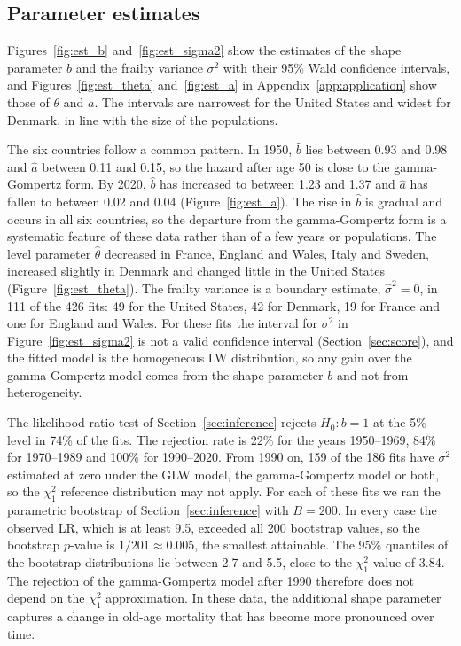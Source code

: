 \documentclass[12pt]{article}
\begin{document}
\subsection{Parameter estimates}

Figures~\ref{fig:est_b} and~\ref{fig:est_sigma2} show the estimates of the shape parameter $b$ and the frailty variance $\sigma^2$ with their 95\% Wald confidence intervals, and Figures~\ref{fig:est_theta} and~\ref{fig:est_a} in Appendix~\ref{app:application} show those of $\theta$ and $a$. The intervals are narrowest for the United States and widest for Denmark, in line with the size of the populations.

The six countries follow a common pattern. In 1950, $\hat b$ lies between 0.93 and 0.98 and $\hat a$ between 0.11 and 0.15, so the hazard after age 50 is close to the gamma-Gompertz form. By 2020, $\hat b$ has increased to between 1.23 and 1.37 and $\hat a$ has fallen to between 0.02 and 0.04 (Figure~\ref{fig:est_a}). The rise in $\hat b$ is gradual and occurs in all six countries, so the departure from the gamma-Gompertz form is a systematic feature of these data rather than of a few years or populations. The level parameter $\hat\theta$ decreased in France, England and Wales, Italy and Sweden, increased slightly in Denmark and changed little in the United States (Figure~\ref{fig:est_theta}). The frailty variance is a boundary estimate, $\hat\sigma^2=0$, in 111 of the 426 fits: 49 for the United States, 42 for Denmark, 19 for France and one for England and Wales. For these fits the interval for $\sigma^2$ in Figure~\ref{fig:est_sigma2} is not a valid confidence interval (Section~\ref{sec:score}), and the fitted model is the homogeneous LW distribution, so any gain over the gamma-Gompertz model comes from the shape parameter $b$ and not from heterogeneity.

The likelihood-ratio test of Section~\ref{sec:inference} rejects $H_0\colon b=1$ at the 5\% level in 74\% of the fits. The rejection rate is 22\% for the years 1950--1969, 84\% for 1970--1989 and 100\% for 1990--2020. From 1990 on, 159 of the 186 fits have $\sigma^2$ estimated at zero under the GLW model, the gamma-Gompertz model or both, so the $\chi^2_1$ reference distribution may not apply. For each of these fits we ran the parametric bootstrap of Section~\ref{sec:inference} with $B=200$. In every case the observed LR, which is at least 9.5, exceeded all 200 bootstrap values, so the bootstrap $p$-value is $1/201\approx0.005$, the smallest attainable. The 95\% quantiles of the bootstrap distributions lie between 2.7 and 5.5, close to the $\chi^2_1$ value of 3.84. The rejection of the gamma-Gompertz model after 1990 therefore does not depend on the $\chi^2_1$ approximation. In these data, the additional shape parameter captures a change in old-age mortality that has become more pronounced over time.
\end{document}
